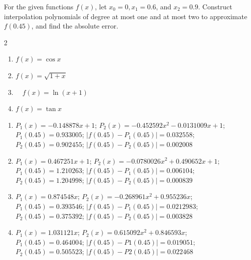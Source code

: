 \begin{myexercise}%
For the given functions $f(x)$, let $x_{0}=0, x_{1}=0.6$, and $x_{2}=0.9$. Construct interpolation polynomials of degree at most one and at most two to approximate $f(0.45)$, and find the absolute error.
\begin{multicols}{2}
\begin{enumerate}[label=(\alph*)]
\item $f(x)=\cos x$
\item $f(x)=\sqrt{1+x}$
\item $\quad f(x)=\ln (x+1)$
\item $f(x)=\tan x$
\end{enumerate}
\end{multicols}

\begin{mysolution}
\begin{enumerate}[label=(\alph*)]
\item $P_1(x)=-0.148878x+1$; $P_2(x)=-0.452592x^2-0.0131009x+1$; $P_1(0.45)=0.933005$;
 $|f(0.45)-P_1(0.45)|=0.032558$; $P_2(0.45)=0.902455$; $|f(0.45)-P_2(0.45)|=0.002008$
\item $P_1(x)=0.467251x+1$; $P_2(x)=-0.0780026x^2+0.490652x+1$; $P_1(0.45)=1.210263$;
 $|f(0.45)-P_1(0.45)|=0.006104$; $P_2(0.45)=1.204998$; $|f(0.45)-P_2(0.45)|=0.000839$
\item $P_1(x)=0.874548x$; $P_2(x)=-0.268961x^2+0.955236x$; $P_1(0.45)=0.393546$; $|f(0.45)-P_1(0.45)|=0.0212983$; $P_2(0.45)=0.375392$; $|f(0.45)-P_2(0.45)|=0.003828$
\item $P_1(x)=1.031121x$; $P_2(x)=0.615092x^2+0.846593x$; $P_1(0.45)=0.464004$; $|f(0.45)-P1(0.45)|=0.019051$; $P_2(0.45)=0.505523$; $|f(0.45)-P2(0.45)|=0.022468$
\end{enumerate}
\end{mysolution}
\end{myexercise}




